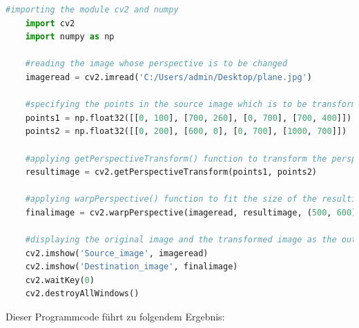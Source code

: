 \begin{lstlisting}[language=Python,caption=Perspektiventransformation Beispiel,label=maai:approxpolydp:code]
    #importing the module cv2 and numpy
    import cv2
    import numpy as np

    #reading the image whose perspective is to be changed
    imageread = cv2.imread('C:/Users/admin/Desktop/plane.jpg')
    
    #specifying the points in the source image which is to be transformed to the corresponding points in the destination image
    points1 = np.float32([[0, 100], [700, 260], [0, 700], [700, 400]])
    points2 = np.float32([[0, 200], [600, 0], [0, 700], [1000, 700]])
    
    #applying getPerspectiveTransform() function to transform the perspective of the given source image to the corresponding points in the destination image
    resultimage = cv2.getPerspectiveTransform(points1, points2)
    
    #applying warpPerspective() function to fit the size of the resulting image from getPerspectiveTransform() function to the size of source image
    finalimage = cv2.warpPerspective(imageread, resultimage, (500, 600))
    
    #displaying the original image and the transformed image as the output on the screen
    cv2.imshow('Source_image', imageread)
    cv2.imshow('Destination_image', finalimage)
    cv2.waitKey(0)
    cv2.destroyAllWindows()
\end{lstlisting}

Dieser Programmcode führt zu folgendem Ergebnis:


